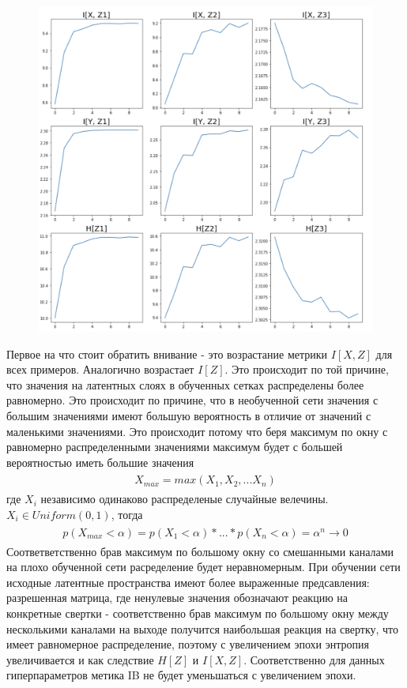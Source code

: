 \begin{figure}[!htb]
\endminipage\hfill
{}
  \includegraphics[width=\linewidth]{images/v4.png}
  
\endminipage
\end{figure}
Первое на что стоит обратить внивание - это возрастание метрики $I[X, Z]$ для всех примеров. Аналогично возрастает $I[Z]$. Это происходит по той причине, что значения на латентных слоях в обученных сетках распределены более равномерно. Это происходит по причине, что в необученной сети значения с большим значениями имеют большую вероятность в отличие от значений с маленькими значениями. Это происходит потому что беря максимум по окну с равномерно распределенными значениями максимум будет с большей вероятностью иметь большие значения
\begin{gather}
\begin{aligned}
X_{max} = max(X_1, X_2, ... X_n)
\end{aligned}
\end{gather}
где $X_i$ независимо одинаково распределеные случайные велечины. $X_i \in Uniform(0, 1)$, тогда 
\begin{gather}
\begin{aligned}
p(X_{max} < \alpha) = p(X_1 < \alpha) * ... * p(X_n < \alpha) = \alpha^{n} \rightarrow 0
\end{aligned}
\end{gather}
Соответветственно брав максимум по большому окну со смешанными каналами на плохо обученной сети расределение будет неравномерным. При обучении сети исходные латентные пространства имеют более выраженные предсавления: разрешенная матрица, где ненулевые значения обозначают реакцию на конкретные свертки - соответственно брав максимум по большому окну между несколькими каналами на выходе получится наибольшая реакция на свертку, что имеет равномерное распределение, поэтому с увеличением эпохи энтропия увеличивается и как следствие $H[Z]$ и $I[X, Z]$. Соответственно для данных гиперпараметров метика IB не будет уменьшаться с увеличением эпохи. \\
